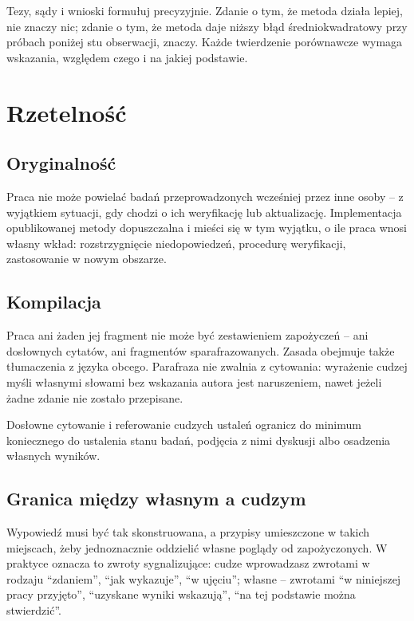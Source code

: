 Tezy, sądy i wnioski formułuj precyzyjnie. Zdanie o tym, że metoda działa lepiej, nie znaczy nic; zdanie o tym, że metoda daje niższy błąd średniokwadratowy przy próbach poniżej stu obserwacji, znaczy. Każde twierdzenie porównawcze wymaga wskazania, względem czego i na jakiej podstawie.

\section{Rzetelność}

\subsection{Oryginalność}

Praca nie może powielać badań przeprowadzonych wcześniej przez inne osoby -- z wyjątkiem sytuacji, gdy chodzi o ich weryfikację lub aktualizację. Implementacja opublikowanej metody  dopuszczalna i mieści się w tym wyjątku, o ile praca wnosi własny wkład: rozstrzygnięcie niedopowiedzeń, procedurę weryfikacji, zastosowanie w nowym obszarze.

\subsection{Kompilacja}

Praca ani żaden jej fragment nie może być zestawieniem zapożyczeń -- ani dosłownych cytatów, ani fragmentów sparafrazowanych. Zasada obejmuje także tłumaczenia z języka obcego. Parafraza nie zwalnia z cytowania: wyrażenie cudzej myśli własnymi słowami bez wskazania autora jest naruszeniem, nawet jeżeli żadne zdanie nie zostało przepisane.

Dosłowne cytowanie i referowanie cudzych ustaleń ogranicz do minimum koniecznego do ustalenia stanu badań, podjęcia z nimi dyskusji albo osadzenia własnych wyników.

\subsection{Granica między własnym a cudzym}

Wypowiedź musi być tak skonstruowana, a przypisy umieszczone w takich miejscach, żeby jednoznacznie oddzielić własne poglądy od zapożyczonych.  W praktyce oznacza to zwroty sygnalizujące: cudze wprowadzasz zwrotami w rodzaju \enquote{zdaniem}, \enquote{jak wykazuje}, \enquote{w ujęciu}; własne -- zwrotami \enquote{w niniejszej pracy przyjęto}, \enquote{uzyskane wyniki wskazują}, \enquote{na tej podstawie można stwierdzić}.

